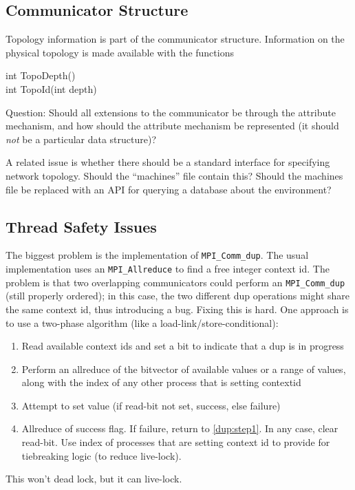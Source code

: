 \documentclass{article}
\begin{document}
\subsection{Communicator Structure}

Topology information is part of the communicator structure.
Information on the physical topology is made available with the functions
\begin{description}
\item[int TopoDepth()]
\item[int TopoId(int depth)]
\end{description}

Question: Should all extensions to the communicator be through the attribute
mechanism, and how should the attribute mechanism be represented (it should
\emph{not} be a particular data structure)?

A related issue is whether there should be a standard interface for specifying
network topology.  Should the ``machines'' file contain this?  Should the
machines file be replaced with an API for querying a database about the
environment?

\subsection{Thread Safety Issues}
The biggest problem is the implementation of \texttt{MPI\_Comm\_dup}.  The
usual implementation uses an \texttt{MPI\_Allreduce} to find a free integer
context id.  The problem is that two overlapping communicators could perform an
\texttt{MPI\_Comm\_dup} (still properly ordered); in this case, the two
different dup operations might share the same context id, thus introducing a
bug.  Fixing this is hard.  One approach is to use a two-phase algorithm (like
a load-link/store-conditional):
\begin{enumerate}
\item Read available context ids and set a bit to indicate that a dup is in
  progress\label{dup:step1}
\item Perform an allreduce of the bitvector of available values or a range of
  values, along with the index of any other process that is setting contextid
\item Attempt to set value (if read-bit not set, success, else failure)
\item Allreduce of success flag.  If failure, return to \ref{dup:step1}.
In any case, clear read-bit.  Use index of processes that are setting context
id to provide for tiebreaking logic (to reduce live-lock).
\end{enumerate}
This won't dead lock, but it can live-lock.  
\end{document}
